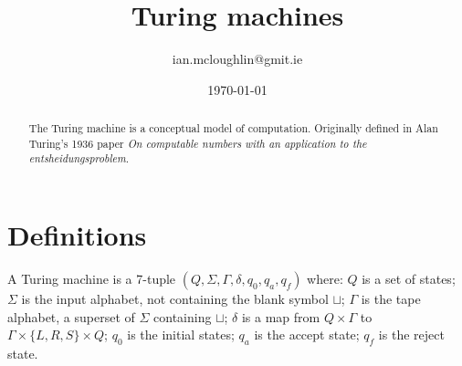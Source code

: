 

\title{Turing machines}
\author{ian.mcloughlin@gmit.ie}
\date{\today}



\maketitle

\begin{abstract}
  The Turing machine is a conceptual model of computation.
  Originally defined in Alan Turing's 1936 paper \emph{On computable numbers with an application to the entsheidungsproblem}.
\end{abstract}

\section{Definitions}
  A Turing machine is a 7-tuple \( ( Q, \Sigma, \Gamma, \delta, q_0, q_a, q_f ) \) where:
    \( Q \) is a set of states;
    \( \Sigma \) is the input alphabet, not containing the blank symbol \( \sqcup \);
    \( \Gamma \) is the tape alphabet, a superset of \( \Sigma \) containing \( \sqcup \);
    \( \delta \) is a map from \( Q \times \Gamma \) to \( \Gamma \times \{ L, R, S \} \times Q \);
    \( q_0 \) is the initial states;
    \( q_a \) is the accept state;
    \( q_f \) is the reject state.    
